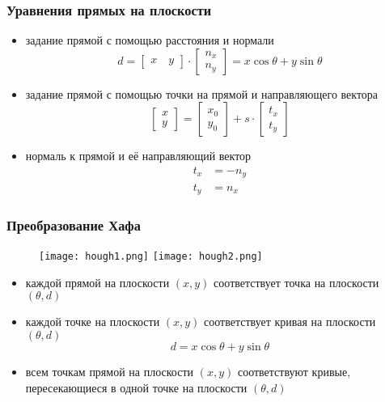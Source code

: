 \documentclass[
    12pt, 
    usepdftitle=false,
    aspectratio=1610
]{beamer}
\begin{document}
\begin{frame}
\frametitle{Уравнения прямых на плоскости}
\begin{itemize}
    \item задание прямой с помощью расстояния и нормали
    $$
        d=
        \begin{bmatrix}
            x\quad y
        \end{bmatrix}
        \cdot
        \begin{bmatrix}
            n_x \\ n_y
        \end{bmatrix}=
        x\cos\theta+y\sin\theta
    $$
    \item задание прямой с помощью точки на прямой и направляющего вектора
    $$
        \begin{bmatrix}
            x \\ y
        \end{bmatrix} =
        \begin{bmatrix}
            x_0 \\ y_0
        \end{bmatrix}+
        s\cdot \begin{bmatrix}
            t_x \\ t_y
        \end{bmatrix}
    $$
    \item нормаль к прямой и её направляющий вектор
    \begin{align*}
        t_x &= -n_y \\
        t_y &= n_x
    \end{align*}
\end{itemize}
\end{frame}

\begin{frame}
\frametitle{Преобразование Хафа}
\begin{figure}
    \centering
    \texttt{[image: hough1.png]}
    \hspace{1cm}
    \texttt{[image: hough2.png]}
\end{figure}
\begin{itemize}
    \item каждой прямой на плоскости $(x,y)$ соответствует точка на плоскости $(\theta, d)$
    \item каждой точке на плоскости $(x,y)$ соответствует кривая на плоскости $(\theta, d)$ 
    $$
        d=x\cos\theta+y\sin\theta
    $$
    \item всем точкам прямой на плоскости $(x,y)$ соответствуют кривые, пересекающиеся в одной точке на плоскости $(\theta, d)$ 
\end{itemize}
\end{frame}
\end{document}
